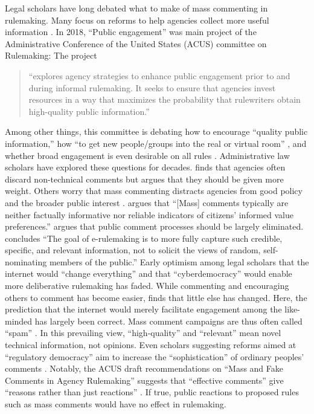 Legal scholars have long debated what to make of mass commenting in rulemaking. Many focus on reforms to help agencies collect more useful information \citep{Farina2011, Farina2014, Rauch2016}. In 2018, ``Public engagement'' was main project of the Administrative Conference of the United States (ACUS) committee on Rulemaking: %
{The project} 
\begin{quote}``explores agency strategies to enhance public engagement prior to and during informal rulemaking. It seeks to ensure that agencies invest resources in a way that maximizes the probability that rulewriters obtain high-quality public information.'' 
\end{quote} 
Among other things, this committee is debating how to encourage ``quality public information,'' how ``to get new people/groups into the real or virtual room'' \citep{Farina2018}, and whether broad engagement is even desirable on all rules \citep{White2018}. Administrative law scholars have explored these questions for decades. \citet{Mendelson2011} finds that agencies often discard non-technical comments but argues that they should be given more weight. Others worry that mass commenting distracts agencies from good policy and the broader public interest \citep{Coglianese2006}. \citet[p. 112]{Farina2012} argues that ``[Mass] comments typically are neither factually informative nor reliable indicators of citizens’ informed value preferences.'' \citet{Rossi1997} argues that public comment processes should be largely eliminated. \citet[p. 208]{Herz2016} concludes ``The goal of e-rulemaking is to more fully capture such credible, specific, and relevant information, not to solicit the views of random, self-nominating members of the public.'' Early optimism among legal scholars that the internet would ``change everything'' \citep{Johnson1998} and that ``cyberdemocracy''  would enable more deliberative rulemaking has faded.  
While commenting and encouraging others to comment has become easier, \citet{Coglianese2006} finds that little else has changed. 
Here, the prediction that the internet would merely facilitate engagement among the like-minded \citep{Sunstein2001} has largely been correct.
Mass comment campaigns are thus often called ``spam'' \citep{Balla2018}.
In this prevailing view, ``high-quality'' and ``relevant'' mean novel technical information, not opinions.
Even scholars suggesting reforms aimed at ``regulatory democracy'' aim to increase the ``sophistication'' of ordinary peoples' comments \citep{Cuellar2014}. Notably, the ACUS draft recommendations on ``Mass and Fake Comments in Agency Rulemaking'' suggests that ``effective comments'' give ``reasons rather than just reactions'' \citep[p. 33]{ACUS2018}. If true, public reactions to proposed rules such as mass comments would have no effect in rulemaking. 

